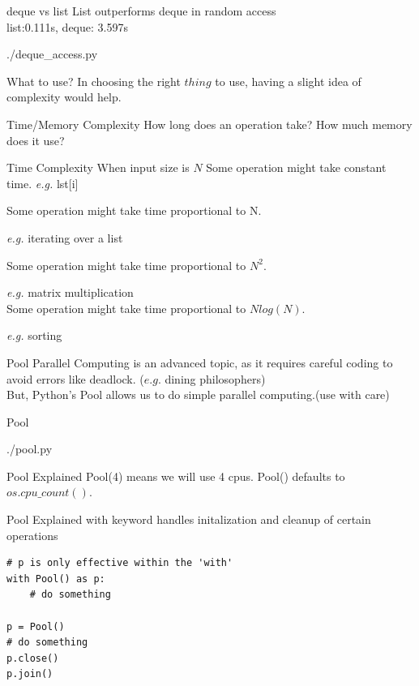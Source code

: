 \documentclass{beamer}
\begin{document}
\begin{frame}{deque vs list}
  List outperforms deque in random access\\
  list:0.111s, deque: 3.597s
  \begin{lstinputlisting}
    {./deque_access.py}
  \end{lstinputlisting}
\end{frame}

\begin{frame}{What to use?}
  In choosing the right $thing$ to use, having a slight idea of complexity
  would help.
\end{frame}

\begin{frame}{Time/Memory Complexity}
  How long does an operation take? How much memory does it use?\\
\end{frame}

\begin{frame}{Time Complexity}
  When input size is $N$
  Some operation might take constant time. \textit{e.g.} lst[i]

  Some operation might take time proportional to N.

  \textit{e.g.} iterating over a list

  Some operation might take time proportional to $N^{2}$.

  \textit{e.g.} matrix multiplication\\

  Some operation might take time proportional to $Nlog(N)$.

  \textit{e.g.} sorting
\end{frame}

\begin{frame}{Pool}
  Parallel Computing is an advanced topic, as it requires careful coding to
  avoid errors like deadlock. ($e.g.$ dining philosophers)\\
  But, Python's Pool allows us to do simple parallel computing.(use with care)
\end{frame}

\begin{frame}{Pool}
  \begin{lstinputlisting}
    {./pool.py}
  \end{lstinputlisting}
\end{frame}

\begin{frame}{Pool Explained}
  Pool(4) means we will use 4 cpus. Pool() defaults to $os.cpu\_count()$.\\
\end{frame}

\begin{frame}[fragile]{Pool Explained}
 with keyword handles initalization and cleanup of certain operations
\begin{lstlisting}
# p is only effective within the 'with'
with Pool() as p:
    # do something

p = Pool()
# do something
p.close()
p.join()
\end{lstlisting}
\end{frame}
\end{document}
